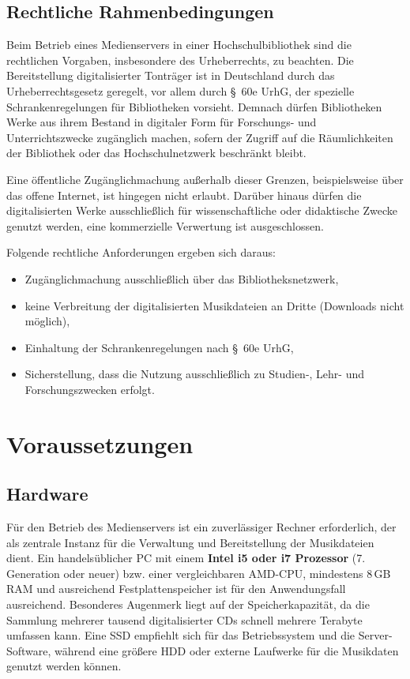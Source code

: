 \documentclass[12pt,a4paper]{report}
\begin{document}
  \subsection{Rechtliche Rahmenbedingungen}
  Beim Betrieb eines Medienservers in einer Hochschulbibliothek sind die rechtlichen Vorgaben, insbesondere des Urheberrechts, zu beachten. 
  Die Bereitstellung digitalisierter Tonträger ist in Deutschland durch das Urheberrechtsgesetz geregelt, 
  vor allem durch §~60e \ac{UrhG}, der spezielle Schrankenregelungen für Bibliotheken vorsieht.  
  Demnach dürfen Bibliotheken Werke aus ihrem Bestand in digitaler Form für Forschungs- und Unterrichtszwecke zugänglich machen, 
  sofern der Zugriff auf die Räumlichkeiten der Bibliothek oder das Hochschulnetzwerk beschränkt bleibt.  

  Eine öffentliche Zugänglichmachung außerhalb dieser Grenzen, beispielsweise über das offene Internet, ist hingegen nicht erlaubt.  
  Darüber hinaus dürfen die digitalisierten Werke ausschließlich für wissenschaftliche oder didaktische Zwecke genutzt werden, 
  eine kommerzielle Verwertung ist ausgeschlossen.  

  Folgende rechtliche Anforderungen ergeben sich daraus:
  \begin{itemize}
    \item Zugänglichmachung ausschließlich über das Bibliotheksnetzwerk,
    \item keine Verbreitung der digitalisierten Musikdateien an Dritte (Downloads nicht möglich),
    \item Einhaltung der Schrankenregelungen nach §~60e \ac{UrhG},
    \item Sicherstellung, dass die Nutzung ausschließlich zu Studien-, Lehr- und Forschungszwecken erfolgt.
  \end{itemize}

\section{Voraussetzungen}
  \subsection{Hardware}
  Für den Betrieb des Medienservers ist ein zuverlässiger Rechner erforderlich, der als zentrale Instanz für die Verwaltung und Bereitstellung der Musikdateien dient. 
  Ein handelsüblicher \ac{PC} mit einem \textbf{Intel i5 oder i7 Prozessor} (7.\,Generation oder neuer) bzw. einer vergleichbaren AMD-\ac{CPU}, mindestens 8\,GB \ac{RAM} und ausreichend Festplattenspeicher ist für den Anwendungsfall ausreichend. 
  Besonderes Augenmerk liegt auf der Speicherkapazität, da die Sammlung mehrerer tausend digitalisierter CDs schnell mehrere Terabyte umfassen kann. 
  Eine \ac{SSD} empfiehlt sich für das Betriebssystem und die Server-Software, während eine größere \ac{HDD} oder externe Laufwerke für die Musikdaten genutzt werden können.
\end{document}
